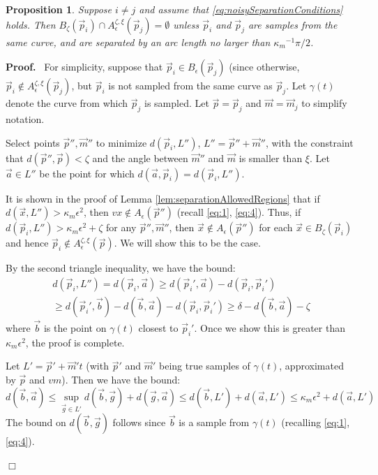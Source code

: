 \documentclass{article}
\newcommand{\nin}{\not\in}
\newtheorem{proposition}[cntr]{Proposition}
\newenvironment{proof}{
  \noindent\textbf{Proof.}\ }{\hspace*{\fill}
  \begin{math}\Box\end{math}\medskip}
\numberwithin{cntr}{section}
\numberwithin{equation}{section}
\newcommand{\vx}[0]{{\vec{x}}}
\newcommand{\vp}[0]{{\vec{p}}}
\newcommand{\vm}[0]{{\vec{m}}}
\newcommand{\va}[0]{{\vec{a}}}
\newcommand{\vb}[0]{{\vec{b}}}
\newcommand{\vg}[0]{{\vec{g}}}
\newcommand{\ball}[2]{ { B_{#1}(#2) } }
\newcommand{\allowed}[2]{ { A_{#1}(#2) } }
\newcommand{\curvemax}{{\kappa_{m}}}
\newcommand{\curvemaxi}{{\curvemax^{-1}}}
\newcommand{\curvesep}{{\delta}}
\newcommand{\pointNoise}{{\zeta}}
\newcommand{\tanNoise}{{\xi}}
\newcommand{\nallowed}[2]{ { A^{\pointNoise, \tanNoise}_{#1}(#2) } }
\begin{document}
\begin{proposition}
  Suppose $i \neq j$ and assume that
  \eqref{eq:noisySeparationConditions} holds.
  Then $\ball{\pointNoise}{\vp_{i}} \cap
  \nallowed{\epsilon}{\vp_{j}} = \emptyset$ unless $\vp_{i}$ and $\vp_{j}$
  are samples from the same curve, and are separated by an arc length no
  larger than $\curvemaxi \pi/2$.
\end{proposition}

\begin{proof}
  For simplicity, suppose that $\vp_{i} \in \ball{\epsilon}{\vp_{j}}$ (since otherwise, $\vp_{i} \nin \nallowed{\epsilon}{\vp_{j}}$, but $\vp_{i}$ is not sampled from the same curve as $\vp_{j}$. Let $\gamma(t)$ denote the curve from which $\vp_{j}$ is sampled. Let $\vp = \vp_{j}$ and $\vm = \vm_{j}$ to simplify notation.

  Select points $\vp'', \vm''$ to minimize $d(\vp_{i},L'')$, $L''=\vp''+\vm''$, with the constraint that $d(\vp'',\vp) < \pointNoise$ and the angle between $\vm''$ and $\vm$ is smaller than $\tanNoise$. Let $\va \in L''$ be the point for which $d(\va,\vp_{i}) = d(\vp_{i},L'')$.

  It is shown in the proof of Lemma \ref{lem:separationAllowedRegions} that if $d(\vx, L'') > \curvemax \epsilon^{2}$, then $vx \nin \allowed{\epsilon}{\vp''}$ (recall \eqref{eq:1}, \eqref{eq:4}). Thus, if $d(\vp_{i},L'') > \curvemax \epsilon^{2} + \pointNoise$ for any $\vp'', \vm''$, then $\vx \nin \allowed{\epsilon}{\vp''}$ for each $\vx \in \ball{\pointNoise}{\vp_{i}}$ and hence $\vp_{i} \nin \nallowed{\epsilon}{\vp}$. We will show this to be the case.


  By the second triangle inequality, we have the bound:
  \begin{multline}
    \label{eq:7}
    d(\vp_{i},L'') = d(\vp_{i},\va) \geq d(\vp_{i}',\va) - d(\vp_{i}, \vp_{i}')\\
    \geq d(\vp_{i}', \vb) - d(\vb,\va) - d(\vp_{i}, \vp_{i}')
    \geq \curvesep - d(\vb,\va) - \pointNoise
  \end{multline}
  where $\vb$ is the point on $\gamma(t)$ closest to $\vp_{i}'$. Once we show this is greater than $\curvemax \epsilon^{2}$, the proof is complete.

Let $L'=\vp' + \vm' t$ (with $\vp'$ and $\vm'$ being true samples of $\gamma(t)$, approximated by $\vp$ and $vm$). Then we have the bound:
  \begin{equation}
    \label{eq:6}
    d(\vb,\va) \leq \sup_{\vg \in L'} d(\vb,\vg) + d(\vg, \va) \leq d(\vb,L') + d(\va,L') \leq \curvemax \epsilon^{2} + d(\va,L')
  \end{equation}
  The bound on $d(\vb, \vg)$ follows since $\vb$ is a sample from $\gamma(t)$ (recalling \eqref{eq:1}, \eqref{eq:4}).


\end{proof}
\end{document}
